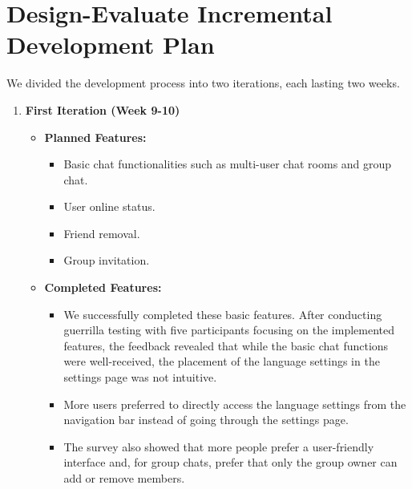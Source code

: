 \documentclass[12pt]{article}
\begin{document}
\newpage

\section {Design-Evaluate Incremental Development Plan}
We divided the development process into two iterations, each lasting two weeks.

\begin{enumerate}
    \item \textbf{First Iteration (Week 9-10)}
        \begin{itemize}
            \item \textbf{Planned Features:}
            \begin{itemize}
                \item Basic chat functionalities such as multi-user chat rooms and group chat.
                \item User online status.
                \item Friend removal.
                \item Group invitation.
            \end{itemize}
            \item \textbf{Completed Features:}
            \begin{itemize}
                \item We successfully completed these basic features. After conducting guerrilla testing with five participants focusing on the implemented features, the feedback revealed that while the basic chat functions were well-received, the placement of the language settings in the settings page was not intuitive.
                \item More users preferred to directly access the language settings from the navigation bar instead of going through the settings page.
                \item The survey also showed that more people prefer a user-friendly interface and, for group chats, prefer that only the group owner can add or remove members.
            \end{itemize}
        \end{itemize}


\end{enumerate}
\end{document}
